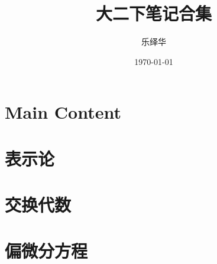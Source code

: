 \documentclass{mynote}
\title{大二下笔记合集}
\author{乐绎华}
\date{\today}
\begin{document}
\chapter{Main Content}

\tableofcontents






\chapter{表示论}







\chapter{交换代数}





\chapter{偏微分方程}
















\end{document}
